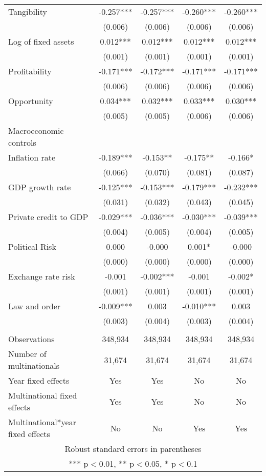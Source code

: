 \begin{longtable}{lcccc}
\quad Tangibility & -0.257*** & -0.257*** & -0.260*** & -0.260*** \\
 & (0.006) & (0.006) & (0.006) & (0.006) \\
\quad Log of fixed assets & 0.012*** & 0.012*** & 0.012*** & 0.012*** \\
 & (0.001) & (0.001) & (0.001) & (0.001) \\
\quad Profitability & -0.171*** & -0.172*** & -0.171*** & -0.171*** \\
 & (0.006) & (0.006) & (0.006) & (0.006) \\
\quad Opportunity & 0.034*** & 0.032*** & 0.033*** & 0.030*** \\
 & (0.005) & (0.005) & (0.006) & (0.006) \\
       Macroeconomic controls &  &  &  \\
\quad Inflation rate & -0.189*** & -0.153** & -0.175** & -0.166* \\
 & (0.066) & (0.070) & (0.081) & (0.087) \\
\quad GDP growth rate & -0.125*** & -0.153*** & -0.179*** & -0.232*** \\
 & (0.031) & (0.032) & (0.043) & (0.045) \\
\quad Private credit to GDP & -0.029*** & -0.036*** & -0.030*** & -0.039*** \\
 & (0.004) & (0.005) & (0.004) & (0.005) \\
\quad Political Risk & 0.000 & -0.000 & 0.001* & -0.000 \\
 & (0.000) & (0.000) & (0.000) & (0.000) \\
\quad Exchange rate risk & -0.001 & -0.002*** & -0.001 & -0.002* \\
 & (0.001) & (0.001) & (0.001) & (0.001) \\
\quad Law and order & -0.009*** & 0.003 & -0.010*** & 0.003 \\
 & (0.003) & (0.004) & (0.003) & (0.004) \\
 &  &  &  &  \\
Observations & 348,934 & 348,934 & 348,934 & 348,934 \\
Number of multinationals & 31,674 & 31,674 & 31,674 & 31,674 \\
Year fixed effects & Yes & Yes & No & No \\
Multinational fixed effects & Yes & Yes & No & No \\
 Multinational*year fixed effects & No & No & Yes & Yes \\ \hline
\multicolumn{5}{c}{ Robust standard errors in parentheses} \\
\multicolumn{5}{c}{ *** p$<$0.01, ** p$<$0.05, * p$<$0.1} \\
\end{longtable}
